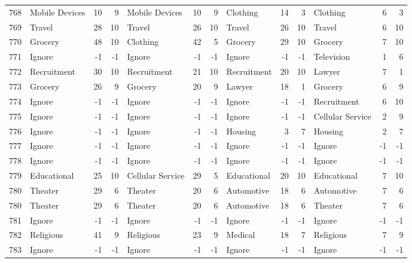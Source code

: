 \begin{figure}[htbp]
\begin{tabular}{rlrrlrrlrrlrr}
    768   & Mobile Devices & 10    & 9     & Mobile Devices & 10    & 9     & Clothing & 14    & 3     & Clothing & 6     & 3 \\
    769   & Travel & 28    & 10    & Travel & 26    & 10    & Travel & 26    & 10    & Travel & 6     & 10 \\
    770   & Grocery & 48    & 10    & Clothing & 42    & 5     & Grocery & 29    & 10    & Grocery & 7     & 10 \\
    771   & Ignore & -1    & -1    & Ignore & -1    & -1    & Ignore & -1    & -1    & Television & 1     & 6 \\
    772   & Recruitment & 30    & 10    & Recruitment & 21    & 10    & Recruitment & 20    & 10    & Lawyer & 7     & 1 \\
    773   & Grocery & 26    & 9     & Grocery & 20    & 9     & Lawyer & 18    & 1     & Grocery & 6     & 9 \\
    774   & Ignore & -1    & -1    & Ignore & -1    & -1    & Ignore & -1    & -1    & Recruitment & 6     & 10 \\
    775   & Ignore & -1    & -1    & Ignore & -1    & -1    & Ignore & -1    & -1    & Cellular Service & 2     & 9 \\
    776   & Ignore & -1    & -1    & Ignore & -1    & -1    & Housing & 3     & 7     & Housing & 2     & 7 \\
    777   & Ignore & -1    & -1    & Ignore & -1    & -1    & Ignore & -1    & -1    & Ignore & -1    & -1 \\
    778   & Ignore & -1    & -1    & Ignore & -1    & -1    & Ignore & -1    & -1    & Ignore & -1    & -1 \\
    779   & Educational & 25    & 10    & Cellular Service & 29    & 5     & Educational & 20    & 10    & Educational & 7     & 10 \\
    780   & Theater & 29    & 6     & Theater & 20    & 6     & Automotive & 18    & 6     & Automotive & 7     & 6 \\
    780   & Theater & 29    & 6     & Theater & 20    & 6     & Automotive & 18    & 6     & Theater & 7     & 6 \\
    781   & Ignore & -1    & -1    & Ignore & -1    & -1    & Ignore & -1    & -1    & Ignore & -1    & -1 \\
    782   & Religious & 41    & 9     & Religious & 23    & 9     & Medical & 18    & 7     & Religious & 7     & 9 \\
    783   & Ignore & -1    & -1    & Ignore & -1    & -1    & Ignore & -1    & -1    & Ignore & -1    & -1 \\

\end{tabular}
\end{figure}
